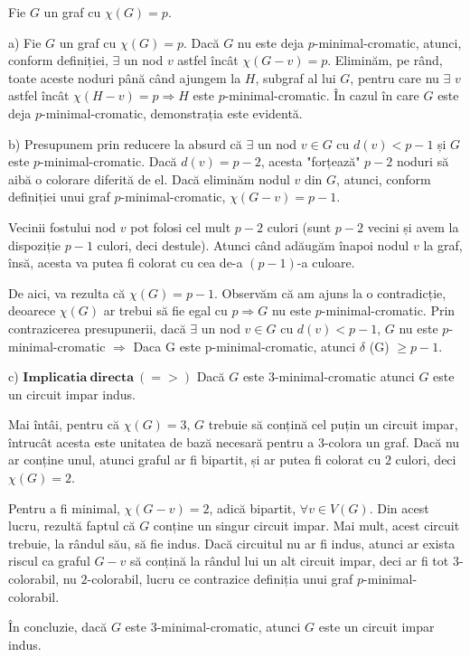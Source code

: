 \documentclass{article}
\begin{document}
{\fontsize{14}{16}\selectfont 
Fie $G$ un graf cu $\chi(G) = p$.

\bigskip
a) Fie $G$ un graf cu $\chi(G) = p$. Dacă $G$ nu este deja $p$-minimal-cromatic, atunci, conform definiției, $\exists$ un nod $v$ astfel încât $\chi(G-v) = p$. Eliminăm, pe rând, toate aceste noduri până când ajungem la $H$, subgraf al lui $G$, pentru care nu $\exists$ $v$ astfel încât $\chi(H-v) = p \Rightarrow H$ este $p$-minimal-cromatic. În cazul în care $G$ este deja $p$-minimal-cromatic, demonstrația este evidentă.

\bigskip
b) Presupunem prin reducere la absurd că $\exists$ un nod $v \in G$ cu $d(v) < p-1$ și $G$ este $p$-minimal-cromatic. Dacă $d(v) = p-2$, acesta "forțează" $p-2$ noduri să aibă o colorare diferită de el. Dacă eliminăm nodul $v$ din $G$, atunci, conform definiției unui graf $p$-minimal-cromatic, $\chi(G-v) = p-1$. \par Vecinii fostului nod $v$ pot folosi cel mult $p-2$ culori (sunt $p-2$ vecini și avem la dispoziție $p-1$ culori, deci destule). Atunci când adăugăm înapoi nodul $v$ la graf, însă, acesta va putea fi colorat cu cea de-a $(p-1)$-a culoare. 
\par De aici, va rezulta că $\chi(G) = p-1$. Observăm că am ajuns la o contradicție, deoarece $\chi(G)$ ar trebui să fie egal cu $p \Rightarrow G$ nu este $p$-minimal-cromatic. Prin contrazicerea presupunerii, dacă $\exists$ un nod $v \in G$ cu $d(v) < p-1$, $G$ nu este $p$-minimal-cromatic $\Rightarrow$ Daca G este p-minimal-cromatic, atunci $\delta$ (G) $\ge p - 1$.

\bigskip
c) $\mathbf{Implicatia\ directa\ (=>)}$ Dacă $G$ este $3$-minimal-cromatic atunci $G$ este un circuit impar indus.
\par
Mai întâi, pentru că $\chi(G) = 3$, $G$ trebuie să conțină cel puțin un circuit impar, întrucât acesta este unitatea de bază necesară pentru a $3$-colora un graf. Dacă nu ar conține unul, atunci graful ar fi bipartit, și ar putea fi colorat cu $2$ culori, deci $\chi(G) = 2$.
\par
Pentru a fi minimal, $\chi(G-v) = 2$, adică bipartit, $\forall v \in V(G)$. Din acest lucru, rezultă faptul că $G$ conține un singur circuit impar. Mai mult, acest circuit trebuie, la rândul său, să fie indus. Dacă circuitul nu ar fi indus, atunci ar exista riscul ca graful $G-v$ să conțină la rândul lui un alt circuit impar, deci ar fi tot $3$-colorabil, nu $2$-colorabil, lucru ce contrazice definiția unui graf $p$-minimal-colorabil. 
\par
În concluzie, dacă $G$ este $3$-minimal-cromatic, atunci $G$ este un circuit impar indus.

}
\end{document}

